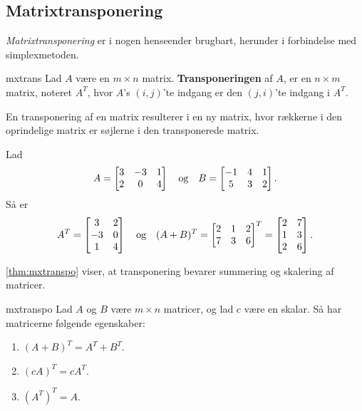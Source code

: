 \subsection{Matrixtransponering}
%
\textit{Matrixtransponering} er i nogen henseender brugbart, herunder i forbindelse med simplexmetoden. 
%
\begin{defn}{}{mxtrans}
Lad $A$ være en $m \times n$ matrix. \textbf{Transponeringen} af $A$, er en $n \times m$ matrix, noteret $A^T$, hvor $A$'s $(i,j)$'te indgang er den $(j,i)$'te indgang i $A^T$.
\end{defn}
\noindent
%
En transponering af en matrix resulterer i en ny matrix, hvor rækkerne i den oprindelige matrix er søjlerne i den transponerede matrix.
\\
%
\begin{eks}
\label{eks:trans}
%
Lad 
%
\begin{align*}
A= 
\begin{bmatrix}
3	&	-3	&	1 \\
2	&	0	&	4
\end{bmatrix}
\text{\phantom{---}og\phantom{---}}
B= 
\begin{bmatrix}
-1	&	4	&	1\\
5	&	3	&	2
\end{bmatrix}.
\end{align*}
%
Så er
%
\begin{align*}
A^T =
\begin{bmatrix}
3	&	2\\
-3	&	0\\
1	&	4
\end{bmatrix}
\text{\phantom{---}og\phantom{---}}
(A+B)^T=
\begin{bmatrix}
2	&	1	&	2\\
7	&	3	&	6
\end{bmatrix}^T
=
\begin{bmatrix}
2	&	7\\
1	&	3\\
2	&	6
\end{bmatrix}.
\end{align*}
%
\end{eks}
%
%
\newpage
\noindent
%
\ref{thm:mxtranspo} viser, at transponering bevarer summering og skalering af matricer.
%
\begin{thm}{}{mxtranspo}
Lad $A$ og $B$ være $m \times n$ matricer, og lad $c$ være en skalar.
Så har matricerne følgende egenskaber:
\begin{enumerate}[label=(\alph*)]
\item $(A + B)^T = A^T + B^T$.
\item $(cA)^T = cA^T$.
\item $(A^T)^T = A$.
\end{enumerate}
\end{thm}
